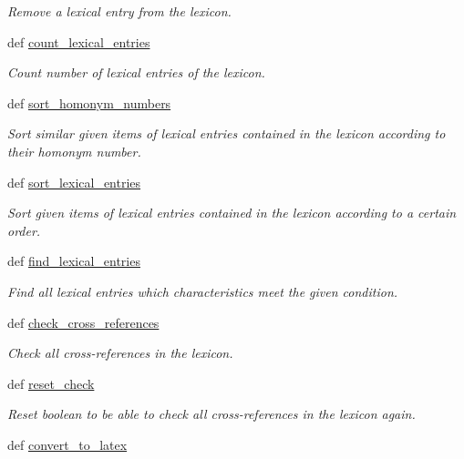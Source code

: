 \begin{DoxyCompactItemize}
\begin{DoxyCompactList}\small\item\em Remove a lexical entry from the lexicon. \end{DoxyCompactList}\item 
def \hyperlink{classlmf_1_1src_1_1core_1_1lexicon_1_1_lexicon_a0e5b3626dcbdbf4ccfda39be46b9e09f}{count\+\_\+lexical\+\_\+entries}
\begin{DoxyCompactList}\small\item\em Count number of lexical entries of the lexicon. \end{DoxyCompactList}\item 
def \hyperlink{classlmf_1_1src_1_1core_1_1lexicon_1_1_lexicon_a3dd2fc39d4bbbac0941c957acb4d663c}{sort\+\_\+homonym\+\_\+numbers}
\begin{DoxyCompactList}\small\item\em Sort similar given items of lexical entries contained in the lexicon according to their homonym number. \end{DoxyCompactList}\item 
def \hyperlink{classlmf_1_1src_1_1core_1_1lexicon_1_1_lexicon_a934a9edcae2b33eb5e7b9ce61cd0234a}{sort\+\_\+lexical\+\_\+entries}
\begin{DoxyCompactList}\small\item\em Sort given items of lexical entries contained in the lexicon according to a certain order. \end{DoxyCompactList}\item 
def \hyperlink{classlmf_1_1src_1_1core_1_1lexicon_1_1_lexicon_a8bb0aef3699fd6cbe10a06e7f2e07975}{find\+\_\+lexical\+\_\+entries}
\begin{DoxyCompactList}\small\item\em Find all lexical entries which characteristics meet the given condition. \end{DoxyCompactList}\item 
def \hyperlink{classlmf_1_1src_1_1core_1_1lexicon_1_1_lexicon_a6dd757b26a4579e8ca167ba2fbd55150}{check\+\_\+cross\+\_\+references}
\begin{DoxyCompactList}\small\item\em Check all cross-\/references in the lexicon. \end{DoxyCompactList}\item 
def \hyperlink{classlmf_1_1src_1_1core_1_1lexicon_1_1_lexicon_a128a65421c5b995d669bbcebca7e0ceb}{reset\+\_\+check}
\begin{DoxyCompactList}\small\item\em Reset boolean to be able to check all cross-\/references in the lexicon again. \end{DoxyCompactList}\item 
def \hyperlink{classlmf_1_1src_1_1core_1_1lexicon_1_1_lexicon_ad47f7c9a54bea805ede556c488ab2a1d}{convert\+\_\+to\+\_\+latex}
\end{DoxyCompactItemize}
